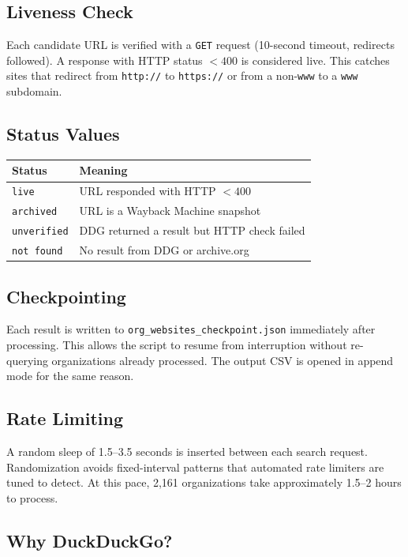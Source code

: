 \documentclass[12pt]{article}
\begin{document}
\subsection{Liveness Check}

Each candidate URL is verified with a \texttt{GET} request (10-second timeout,
redirects followed). A response with HTTP status $< 400$ is considered live.
This catches sites that redirect from \texttt{http://} to \texttt{https://}
or from a non-\texttt{www} to a \texttt{www} subdomain.

\subsection{Status Values}

\begin{center}
\begin{tabular}{ll}
\toprule
Status & Meaning \\
\midrule
\texttt{live} & URL responded with HTTP $< 400$ \\
\texttt{archived} & URL is a Wayback Machine snapshot \\
\texttt{unverified} & DDG returned a result but HTTP check failed \\
\texttt{not found} & No result from DDG or archive.org \\
\bottomrule
\end{tabular}
\end{center}

\subsection{Checkpointing}

Each result is written to \texttt{org\_websites\_checkpoint.json} immediately
after processing. This allows the script to resume from interruption without
re-querying organizations already processed. The output CSV is opened in
append mode for the same reason.

\subsection{Rate Limiting}

A random sleep of 1.5--3.5 seconds is inserted between each search request.
Randomization avoids fixed-interval patterns that automated rate limiters
are tuned to detect. At this pace, 2,161 organizations take approximately
1.5--2 hours to process.

\subsection{Why DuckDuckGo?}
\end{document}
